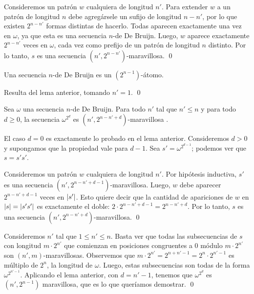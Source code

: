 \documentclass[11pt]{article}
\begin{document}

\begin{demo}
	Consideremos un patrón $w$ cualquiera de longitud $n'$. Para extender $w$ a
	un patrón de longitud $n$ debe agregársele un sufijo de longitud $n-n'$, por
	lo que existen $2^{n-n'}$ formas distintas de hacerlo. Todas
	aparecen exactamente una vez en $\omega$, ya que esta es
	una secuencia $n$-de De Bruijn. Luego, $w$ aparece exactamente $2^{n-n'}$
	veces en $\omega$, cada vez como prefijo de un patrón de longitud $n$
	distinto. Por lo tanto, $s$ es una secuencia $(n',2^{n-n'})$-maravillosa.
	\qed
\end{demo}

\begin{coro}
	Una secuencia $n$-de De Bruijn es un $(2^{n-1})$-átomo.
\end{coro}

\begin{demo}
	Resulta del lema anterior, tomando $n' = 1$. \qed
\end{demo}


\begin{lema}
	Sea $\omega$ una secuencia $n$-de De Bruijn.
	Para todo $n'$ tal que $n' \leq n$ y para todo $d \geq 0$, la
	secuencia $\omega^{2^d}$ es $(n',2^{n-n'+d})$-maravillosa .

\end{lema}

\begin{demo}
	El caso $d = 0$ es exactamente lo probado en el lema anterior.
	Consideremos $d > 0$ y supongamos que la propiedad vale para $d - 1$.
	Sea $s' = \omega^{2^{d-1}}$; podemos ver que $s = s's'$.

	Consideremos un patrón $w$ cualquiera de longitud $n'$. Por hipótesis
	inductiva, $s'$ es una secuencia $(n',2^{n-n'+d-1})$-maravillosa. Luego, $w$
	debe aparecer $2^{n-n'+d-1}$ veces en $\left\vert s'\right\vert$.
	Esto quiere decir que la cantidad de apariciones de $w$ en $\left\vert s\right\vert =
		\left\vert s's'\right\vert$ es exactamente el doble: $2 \cdot 2^{n-n'+d-1} = 2^{n-n'+d}$.
	Por lo tanto, $s$ es una secuencia $(n',2^{n-n'+d})$-maravillosa. \qed

	Consideremos $n'$ tal que $1 \leq n' \leq n$. Basta ver que todas las
	subsecuencias de $s$ con longitud $m \cdot 2^{n'}$ que comienzan en
	posiciones congruentes a $0$ módulo $m \cdot 2^{n'}$ son
	$(n',m)$-maravillosas. Observemos que $m \cdot 2^{n'} = 2^{n+n'-1} = 2^n
		\cdot 2^{n'-1}$ es múltiplo de $2^n$, la longitud de $\omega$.
	Luego, estas subsecuencias son todas de la forma $\omega^{2^{n'-1}}$.
	Aplicando el lema anterior, con $d = n'-1$, tenemos que $\omega^{2^d}$
	es $(n',2^{n-1})$ maravillosa, que es lo que queríamos demostrar. \qed
\end{demo}
\end{document}
